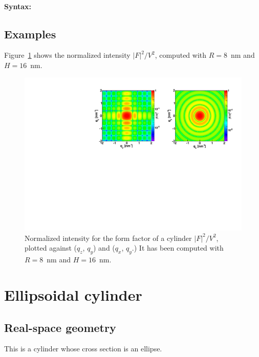 \paragraph{Syntax:} 

\newpage

\subsection{Examples}
Figure~\ref{fig:FFcylinderEx} shows the normalized intensity
$|F|^2/V^2$, computed with $R=8$~nm and \mbox{$H=16$~nm.}
\begin{figure}[h]
\begin{center}
\includegraphics[width=\textwidth]{Figures/figffcylinder}
\end{center}
\caption{Normalized intensity for the form factor of a cylinder
$|F|^2/V^2$, plotted against ($q_z$, $q_y$) and  ($q_x$, $q_y$.) It
has been  computed with $R=8$~nm and $H=16$~nm.}
\label{fig:FFcylinderEx}
\end{figure}
\FloatBarrier


\newpage{\cleardoublepage}
\section{Ellipsoidal cylinder}  

\subsection{Real-space geometry}
This is a cylinder whose cross section is an ellipse.


